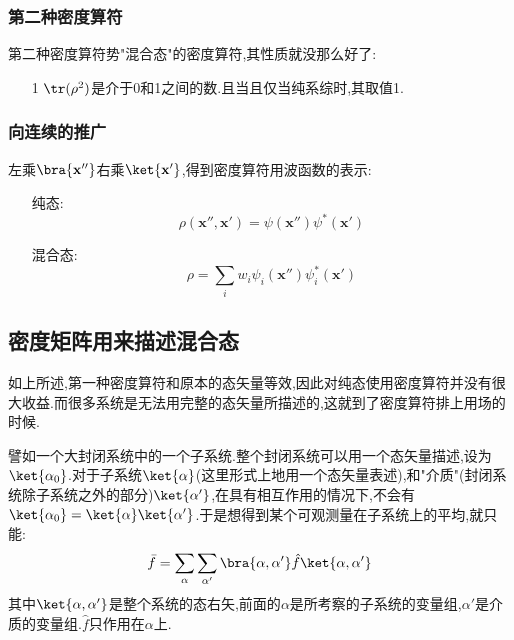 \subsubsection*{第二种密度算符}
    第二种密度算符势"混合态"的密度算符,其性质就没那么好了:
    \begin{itemize}
        \item[1] $\tr(\rho^{2})$是介于0和1之间的数.且当且仅当纯系综时,其取值1.
    \end{itemize}
    
\subsubsection*{向连续的推广}
    左乘$\bra{\mathbf{x}''}$右乘$\ket{\mathbf{x}'}$,得到密度算符用波函数的表示:
    \begin{itemize}
        \item[纯态:]
            \begin{equation}
                \rho(\mathbf{x}'',\mathbf{x}')=\psi(\mathbf{x}'')\psi^{*}(\mathbf{x}')
            \end{equation}
            
        \item[混合态:]
            \begin{equation}
                \rho=\sum_i w_i \psi_i(\mathbf{x}'') \psi_i^{*}(\mathbf{x}')
            \end{equation}
        

    \end{itemize}
    



\subsection{密度矩阵用来描述混合态}
    如上所述,第一种密度算符和原本的态矢量等效,因此对纯态使用密度算符并没有很大收益.而很多系统是无法用完整的态矢量所描述的,这就到了密度算符排上用场的时候.

    譬如一个大封闭系统中的一个子系统.整个封闭系统可以用一个态矢量描述,设为$\ket{\alpha_0}$.对于子系统$\ket{\alpha}$(这里形式上地用一个态矢量表述),和"介质"(封闭系统除子系统之外的部分)$\ket{\alpha'}$,在具有相互作用的情况下,不会有$\ket{\alpha_0}=\ket{\alpha}\ket{\alpha'}$.于是想得到某个可观测量在子系统上的平均,就只能:
    \[\bar{f}=\sum_\alpha \sum_{\alpha'}\bra{\alpha,\alpha'}\hat{f}\ket{\alpha,\alpha'}\]
    其中$\ket{\alpha,\alpha'}$是整个系统的态右矢,前面的$\alpha$是所考察的子系统的变量组,$\alpha'$是介质的变量组.$\hat{f}$只作用在$\alpha$上.

